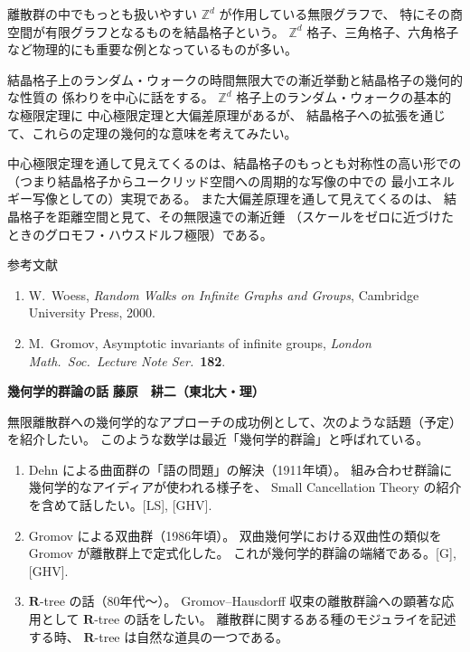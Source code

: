\documentclass[uplatex,dvipdfmx]{jlreq}
\begin{document}
\bigskip

離散群の中でもっとも扱いやすい $\mathbb{Z}^d$ が作用している無限グラフで、
特にその商空間が有限グラフとなるものを結晶格子という。
$\mathbb{Z}^d$ 格子、三角格子、六角格子など物理的にも重要な例となっているものが多い。

結晶格子上のランダム・ウォークの時間無限大での漸近挙動と結晶格子の幾何的な性質の
係わりを中心に話をする。
$\mathbb{Z}^d$ 格子上のランダム・ウォークの基本的な極限定理に
中心極限定理と大偏差原理があるが、
結晶格子への拡張を通じて、これらの定理の幾何的な意味を考えてみたい。

中心極限定理を通して見えてくるのは、結晶格子のもっとも対称性の高い形での
（つまり結晶格子からユークリッド空間への周期的な写像の中での
最小エネルギー写像としての）実現である。
また大偏差原理を通して見えてくるのは、
結晶格子を距離空間と見て、その無限遠での漸近錘
（スケールをゼロに近づけたときのグロモフ・ハウスドルフ極限）である。

\begin{center}
  \textsc{参考文献}
\end{center}
\begin{enumerate}
  \item[{[1]}] W.~Woess,
        \textit{Random Walks on Infinite Graphs and Groups},
        Cambridge University Press, 2000.
  \item[{[2]}] M.~Gromov,
        Asymptotic invariants of infinite groups,
        \textit{London Math.~Soc.~Lecture Note Ser.}~\textbf{182}.
\end{enumerate}

\newpage

\noindent
{\large\bfseries 幾何学的群論の話}
\hfill
{\large\bfseries 藤原　耕二（東北大・理）}

\bigskip

無限離散群への幾何学的なアプローチの成功例として、次のような話題（予定）を紹介したい。
このような数学は最近「幾何学的群論」と呼ばれている。
\begin{enumerate}
  \item Dehn による曲面群の「語の問題」の解決（1911年頃）。
        組み合わせ群論に幾何学的なアイディアが使われる様子を、
        Small Cancellation Theory の紹介を含めて話したい。[LS], [GHV].
  \item Gromov による双曲群（1986年頃）。
        双曲幾何学における双曲性の類似を Gromov が離散群上で定式化した。
        これが幾何学的群論の端緒である。[G], [GHV].
  \item $\mathbf{R}$-tree の話（80年代〜）。
        Gromov--Hausdorff 収束の離散群論への顕著な応用として
        $\mathbf{R}$-tree の話をしたい。
        離散群に関するある種のモジュライを記述する時、
        $\mathbf{R}$-tree は自然な道具の一つである。
\end{enumerate}
\end{document}
